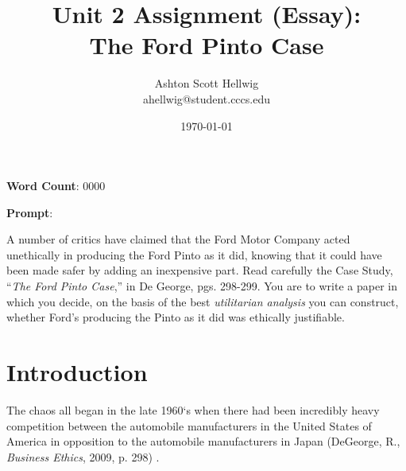 \documentclass[12pt,USenglish,draft]{article}
\title{Unit 2 Assignment (Essay):\\%
    \Large{%
      The Ford Pinto Case%
    }
  }
\author{%
    Ashton Scott Hellwig\\%
    \normalsize{ahellwig@student.cccs.edu}
  }
\date{\today}
\newcommand{\tbcite}[1]{%
    (DeGeorge, R., \textit{Business Ethics}, 2009, p. #1)%
  }
\begin{document}
  \maketitle
  \thispagestyle{plain}
  \vspace{-25pt}
  \begin{mdframed}[%
    style=wordcount,%
    nobreak=true,%
    align=center,%
    userdefinedwidth=10em%
  ]
    \begin{center}
      \textbf{Word Count}: 0000
    \end{center}
  \end{mdframed}

  \tableofcontents
  \vspace{20pt}
  \begin{mdframed}
    \large{\textbf{Prompt}}:

    A number of critics have claimed that the Ford Motor Company acted
      unethically in producing the Ford Pinto as it did, knowing that it could
      have been made safer by adding an inexpensive part. Read carefully the
      Case Study, ``\textit{The Ford Pinto Case},'' in De George, pgs. 298-299.
      You are to write a paper in which you decide, on the basis of the best
      \textit{utilitarian analysis} you can construct, whether Ford's producing
      the Pinto as it did was ethically justifiable.
  \end{mdframed}


  \newpage
  \section{Introduction}
    The chaos all began in the late 1960`s when there had been incredibly heavy
      competition between the automobile manufacturers in the United States of
      America in opposition to the automobile manufacturers in Japan
      \tbcite{298}.


  \newpage
  \nocite{*}
  \printbibliography[%
    heading=bibintoc,%
    title={Works Cited},%
    notcategory=consulted%
  ]
  \printbibliography[%
    heading=bibintoc,%
    title={Works Consulted},%
    category=consulted%
  ]
\end{document}
